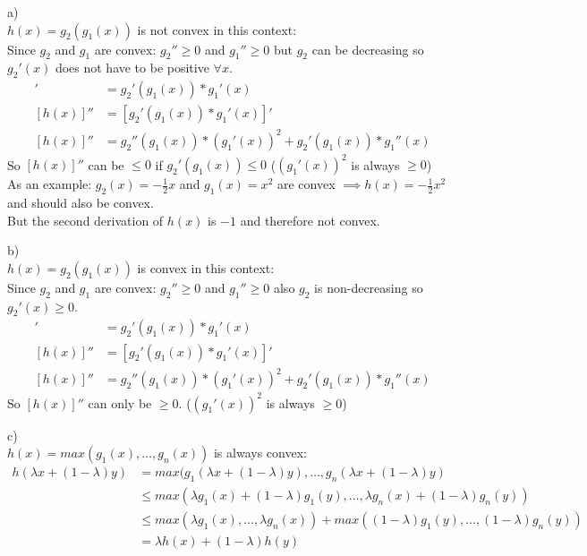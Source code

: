 %
%
%
\begin{flushleft}
a)\\
$h(x)=g_2(g_1(x))$ is not convex in this context:\\
Since $g_2$ and $g_1$ are convex: $g_2''\geq0$ and $g_1''\geq0$ but $g_2$ can 
be decreasing so $g_2'(x)$ does not have to be positive $\forall x$.
\begin{align*}
[h(x)]' &= g_2'(g_1(x))*g_1'(x)\\
[h(x)]'' &= [g_2'(g_1(x))*g_1'(x)]'\\
[h(x)]'' &= g_2''(g_1(x))*(g_1'(x))^2 + g_2'(g_1(x))*g_1''(x)
\end{align*}
So $[h(x)]''$ can be $\leq 0$ if $g_2'(g_1(x)) \leq 0$ ($(g_1'(x))^2$ is 
always $\geq 0$)\\
As an example: $g_2(x)=-\frac{1}{2}x$ and $g_1(x)=x^2$ are convex $\implies h(x)=-\frac{1}{2}x^2$ and should also be convex.\\
But the second derivation of $h(x)$ is $-1$ and therefore not convex.
\end{flushleft}
\begin{flushleft}
b)\\
$h(x)=g_2(g_1(x))$ is convex in this context:\\
Since $g_2$ and $g_1$ are convex: $g_2''\geq0$ and $g_1''\geq0$ also $g_2$ is 
non-decreasing so $g_2'(x) \geq 0$.
\begin{align*}
[h(x)]' &= g_2'(g_1(x))*g_1'(x)\\
[h(x)]'' &= [g_2'(g_1(x))*g_1'(x)]'\\
[h(x)]'' &= g_2''(g_1(x))*(g_1'(x))^2 + g_2'(g_1(x))*g_1''(x)
\end{align*}
So $[h(x)]''$ can only be $\geq 0$. ($(g_1'(x))^2$ is always $\geq 0$)
\end{flushleft}
\begin{flushleft}
c)\\
$h(x)=max(g_1(x),\ldots,g_n(x))$ is always convex:\\
\begin{align*}
h(\lambda x+ (1- \lambda)y) &= max(g_1(\lambda x+ (1- \lambda)y), \ldots , 
g_n(\lambda x+ (1- \lambda)y)\\
&\leq max(\lambda g_1(x) + (1-\lambda)g_1(y),\ldots,\lambda g_n(x) + (1-\lambda)g_n(y))\\
&\leq max(\lambda g_1(x), \ldots , \lambda g_n(x)) + max((1-\lambda) g_1(y), \ldots , (1-\lambda) g_n(y))\\
&= \lambda h(x) + (1-\lambda)h(y)
\end{align*}
\end{flushleft}
